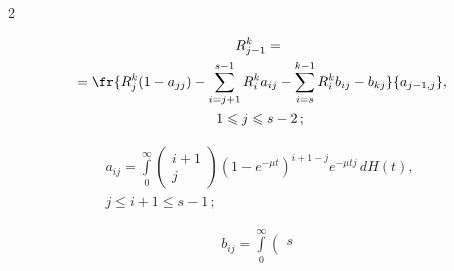 \begin{multicols}{2}
\begin{equation}
 \label{q3}


\end{equation}





\vspace*{-12pt}





\noindent


\begin{multline*}


R_{j-1}^k={}\\


{}=\fr{R_{j}^k(1-a_{jj})-\sum\limits_{i=j+1}^{s-1}R_i^ka_{ij}-


\sum\limits_{i=s}^{k-1}


R_i^kb_{ij}-b_{kj}}{a_{j-1,j}},\\


1\leqslant j\leqslant s-2\,;


\end{multline*}


\vspace*{-12pt}





\noindent


\begin{multline*}


a_{ij}=\int\limits_0^{\infty}\left(


\begin{array}{c}i+1\\ j\end{array}


\right)


\left(1-e^{-\mu t}\right)^{i+1-j}e^{-\mu tj}\,dH(t),\\


 j\leqslant i+1\leqslant s-1\,;


\end{multline*}


\vspace*{-12pt}





\noindent


\begin{multline*}


b_{ij}=\int\limits_0^{\infty}\left(


\begin{array}{c}s\\



\end{array}
\end{multline*}
\end{multicols}
